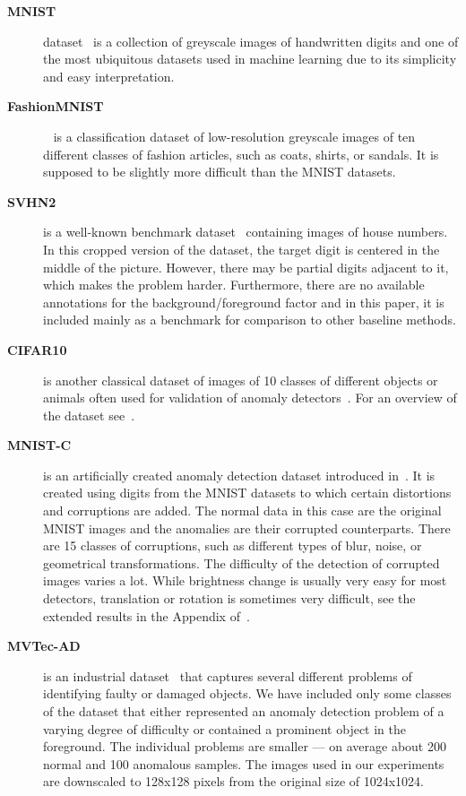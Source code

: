 \begin{description}

    \item[\textbf{MNIST}] dataset~\cite{lecun2010mnist} is a collection of greyscale images of handwritten digits and one of the most ubiquitous datasets used in machine learning due to its simplicity and easy interpretation.
    
    \item[\textbf{FashionMNIST}]~\cite{xiao2017fashion} is a classification dataset of low-resolution greyscale images of ten different classes of fashion articles, such as coats, shirts, or sandals. It is supposed to be slightly more difficult than the MNIST datasets.

    \item[\textbf{SVHN2}] is a well-known benchmark dataset~\cite{netzer2011reading} containing images of house numbers. In this cropped version of the dataset, the target digit is centered in the middle of the picture. However, there may be partial digits adjacent to it, which makes the problem harder. Furthermore, there are no available annotations for the background/foreground factor and in this paper, it is included mainly as a benchmark for comparison to other baseline methods. 
    
    \item[\textbf{CIFAR10}] is another classical dataset of images of 10 classes of different objects or animals often used for validation of anomaly detectors~\cite{ruff2018deep, ruff2019deep, chalapathy2018anomaly}. For an overview of the dataset see~\cite{krizhevsky2009learning}. 

    \item[\textbf{MNIST-C}] is an artificially created anomaly detection dataset introduced in~\cite{muMNISTCRobustnessBenchmark2019}. It is created using digits from the MNIST datasets to which certain distortions and corruptions are added. The normal data in this case are the original MNIST images and the anomalies are their corrupted counterparts. There are 15 classes of corruptions, such as different types of blur, noise, or geometrical transformations. The difficulty of the detection of corrupted images varies a lot. While brightness change is usually very easy for most detectors, translation or rotation is sometimes very difficult, see the extended results in the Appendix of~\cite{vskvara2021comparison}.

    \item[\textbf{MVTec-AD}] is an industrial dataset~\cite{bergmann2019mvtec} that captures several different problems of identifying faulty or damaged objects. We have included only some classes of the dataset that either represented an anomaly detection problem of a varying degree of difficulty or contained a prominent object in the foreground. The individual problems are smaller --- on average about 200 normal and 100 anomalous samples. The images used in our experiments are downscaled to 128x128 pixels from the original size of 1024x1024.
    

\end{description}
